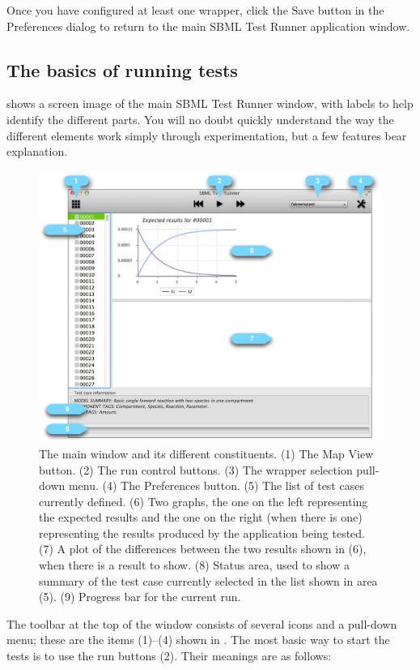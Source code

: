 \documentclass{sbmlpkgspec}
\begin{document}
Once you have configured at least one wrapper, click the Save button in the Preferences dialog to return to the main SBML Test Runner application window.


\subsection{The basics of running tests}

 shows a screen image of the main SBML Test Runner window, with labels to help identify the different parts.  You will no doubt quickly understand the way the different elements work simply through experimentation, but a few features bear explanation.

\begin{figure}[hb]
  \includegraphics[width = 4.5in]{figs/main-window-illustration}
  \caption{The main window and its different constituents.  (1) The Map View button.  (2) The run control buttons.  (3) The wrapper selection pull-down menu.  (4) The Preferences button.  (5) The list of test cases currently defined.  (6) Two graphs, the one on the left representing the expected results and the one on the right (when there is one) representing the results produced by the application being tested.  (7) A plot of the differences between the two results shown in (6), when there is a result to show.  (8) Status area, used to show a summary of the test case currently selected in the list shown in area (5).  (9) Progress bar for the current run.}
  \label{main-window}
\end{figure}


The toolbar at the top of the window consists of several icons and a pull-down menu; these are the items (1)--(4) shown in .  The most basic way to start the tests is to use the run buttons (2).  Their meanings are as follows:
\end{document}
